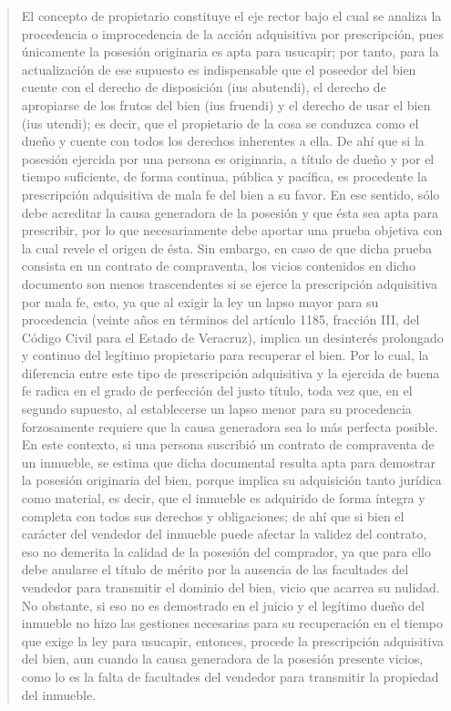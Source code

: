 \documentclass[11pt,a4paper]{article}
\begin{document}
\begin{quote}
El concepto de propietario constituye el eje rector bajo el cual se analiza la procedencia o
improcedencia de la acción adquisitiva por prescripción, pues únicamente la posesión originaria es
apta para usucapir; por tanto, para la actualización de ese supuesto es indispensable que el
poseedor del bien cuente con el derecho de disposición (ius abutendi), el derecho de apropiarse de
los frutos del bien (ius fruendi) y el derecho de usar el bien (ius utendi); es decir, que el propietario
de la cosa se conduzca como el dueño y cuente con todos los derechos inherentes a ella. De ahí
que si la posesión ejercida por una persona es originaria, a título de dueño y por el tiempo
suficiente, de forma continua, pública y pacífica, es procedente la prescripción adquisitiva de mala fe
del bien a su favor. En ese sentido, sólo debe acreditar la causa generadora de la posesión y que
ésta sea apta para prescribir, por lo que necesariamente debe aportar una prueba objetiva con la
cual revele el origen de ésta. Sin embargo, en caso de que dicha prueba consista en un contrato de
compraventa, los vicios contenidos en dicho documento son menos trascendentes si se ejerce la
prescripción adquisitiva por mala fe, esto, ya que al exigir la ley un lapso mayor para su procedencia
(veinte años en términos del artículo 1185, fracción III, del Código Civil para el Estado de Veracruz),
implica un desinterés prolongado y continuo del legítimo propietario para recuperar el bien. Por lo
cual, la diferencia entre este tipo de prescripción adquisitiva y la ejercida de buena fe radica en el
grado de perfección del justo título, toda vez que, en el segundo supuesto, al establecerse un lapso
menor para su procedencia forzosamente requiere que la causa generadora sea lo más perfecta
posible. En este contexto, si una persona suscribió un contrato de compraventa de un inmueble, se
estima que dicha documental resulta apta para demostrar la posesión originaria del bien, porque
implica su adquisición tanto jurídica como material, es decir, que el inmueble es adquirido de forma
íntegra y completa con todos sus derechos y obligaciones; de ahí que si bien el carácter del
vendedor del inmueble puede afectar la validez del contrato, eso no demerita la calidad de la
posesión del comprador, ya que para ello debe anularse el título de mérito por la ausencia de las
facultades del vendedor para transmitir el dominio del bien, vicio que acarrea su nulidad. No
obstante, si eso no es demostrado en el juicio y el legítimo dueño del inmueble no hizo las gestiones
necesarias para su recuperación en el tiempo que exige la ley para usucapir, entonces, procede la
prescripción adquisitiva del bien, aun cuando la causa generadora de la posesión presente vicios,
como lo es la falta de facultades del vendedor para transmitir la propiedad del inmueble.


\end{quote}
\end{document}
